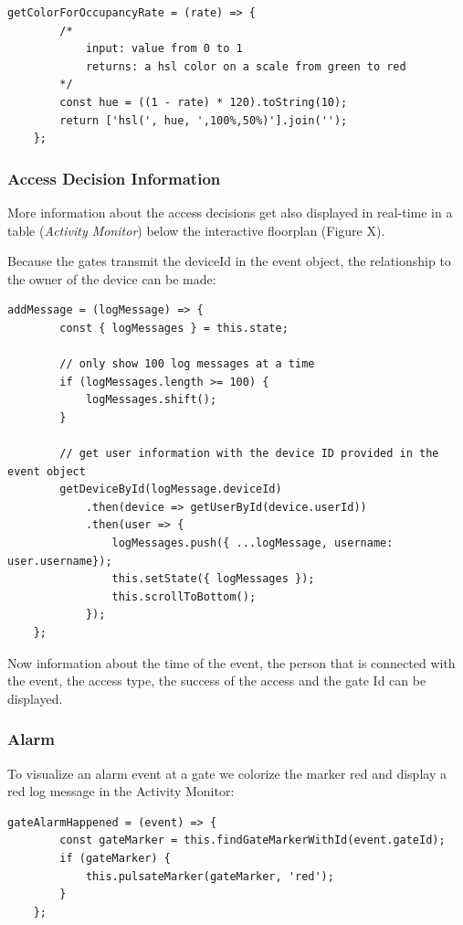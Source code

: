 \begin{lstlisting}[label=getColorForOccupancyRate]
    getColorForOccupancyRate = (rate) => {
        /*
            input: value from 0 to 1
            returns: a hsl color on a scale from green to red
        */
        const hue = ((1 - rate) * 120).toString(10);
        return ['hsl(', hue, ',100%,50%)'].join('');
    };
\end{lstlisting}

\subsubsection{Access Decision Information}

More information about the access decisions get also displayed in real-time in a table (\emph{Activity Monitor}) below the interactive floorplan (Figure X).

Because the gates transmit the deviceId in the event object, the relationship to the owner of the device can be made:

\begin{lstlisting}[label=addMessage]
addMessage = (logMessage) => {
        const { logMessages } = this.state;
        
        // only show 100 log messages at a time
        if (logMessages.length >= 100) {
            logMessages.shift();
        }

		// get user information with the device ID provided in the event object
        getDeviceById(logMessage.deviceId)
            .then(device => getUserById(device.userId))
            .then(user => {
                logMessages.push({ ...logMessage, username: user.username});
                this.setState({ logMessages });
                this.scrollToBottom();
            });
    };
\end{lstlisting}

Now information about the time of the event, the person that is connected with the event, the access type, the success of the access and the gate Id can be displayed.

\subsubsection{Alarm}

To visualize an alarm event at a gate we colorize the marker red and display a red log message in the Activity Monitor:

\begin{lstlisting}[label=alarmEventHappened]
gateAlarmHappened = (event) => {
        const gateMarker = this.findGateMarkerWithId(event.gateId);
        if (gateMarker) {
            this.pulsateMarker(gateMarker, 'red');
        }
    };
\end{lstlisting}

